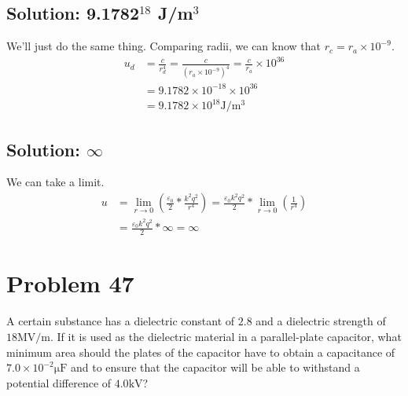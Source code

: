 \documentclass[12pt]{article}
\begin{document}
\subsection{Solution: 9.1782$^{18}$ J/m$^3$}
We'll just do the same thing. 
Comparing radii, we can know that $r_c = r_a \times 10^{-9}$.
\begin{align*}
    u_d &=  \frac{c}{r_d^4}
        =   \frac{c}{(r_a \times 10^{-9})^4}
        =   \frac{c}{r_a} \times 10^{36}\\
        &=  9.1782 \times 10^{-18} \times 10^{36}\\
        &=  \boxed{9.1782 \times 10^{18} \unit{\joule/\meter^3}}
\end{align*}

\subsection{Solution: $\infty$}
We can take a limit.
\begin{align*}
    u   &=  \underset{r\to 0}{\lim}\left( \frac{\varepsilon_0}{2}*\frac{k^2q^2}{r^4} \right)
        =   \frac{\varepsilon_0k^2q^2}{2}*\underset{r\to 0}{\lim}\left( \frac{1}{r^4} \right)\\
        &=  \frac{\varepsilon_0k^2q^2}{2}*\infty
        =   \boxed{\infty}
\end{align*}

\pagebreak
\section{Problem 47}
A certain substance has a dielectric constant of $2.8$ and a dielectric strength of $18 \unit{\mega\volt/\meter}$. 
If it is used as the dielectric material in a parallel-plate capacitor, what minimum area should the plates of the capacitor have to obtain a capacitance of $7.0 \times 10^{-2} \unit{\micro\farad}$ and to ensure that the capacitor will be able to withstand a potential difference of $4.0 \unit{\kilo\volt}$?
\end{document}
